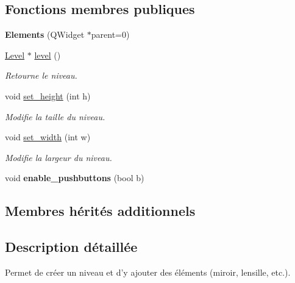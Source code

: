 \subsection*{Fonctions membres publiques}
\begin{DoxyCompactItemize}
\item 
\hypertarget{classElements_a2b73500c747cc879fe708d35aba45532}{{\bfseries Elements} (Q\+Widget $\ast$parent=0)}\label{classElements_a2b73500c747cc879fe708d35aba45532}

\item 
\hyperlink{classLevel}{Level} $\ast$ \hyperlink{classElements_add91eac75df596342176acac4eb8b1a1}{level} ()
\begin{DoxyCompactList}\small\item\em Retourne le niveau. \end{DoxyCompactList}\item 
void \hyperlink{classElements_a077b89b923b450bda172001121825e03}{set\+\_\+height} (int h)
\begin{DoxyCompactList}\small\item\em Modifie la taille du niveau. \end{DoxyCompactList}\item 
void \hyperlink{classElements_af6c7af0c40d3840296224453352fc534}{set\+\_\+width} (int w)
\begin{DoxyCompactList}\small\item\em Modifie la largeur du niveau. \end{DoxyCompactList}\item 
\hypertarget{classElements_ac8411c290c41dcb1777cb649155d3c04}{void {\bfseries enable\+\_\+pushbuttons} (bool b)}\label{classElements_ac8411c290c41dcb1777cb649155d3c04}

\end{DoxyCompactItemize}
\subsection*{Membres hérités additionnels}


\subsection{Description détaillée}
Permet de créer un niveau et d’y ajouter des éléments (miroir, lensille, etc.). 

